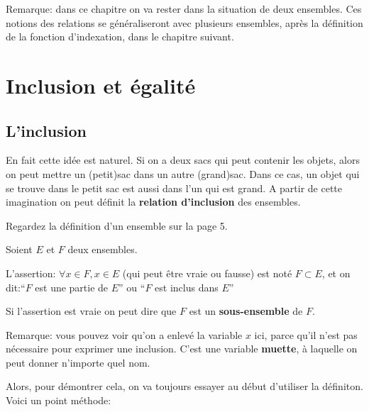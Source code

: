 \documentclass{article}
\begin{document}
Remarque: dans ce chapitre on va rester dans la situation de deux ensembles. Ces notions des relations se généraliseront avec plusieurs ensembles, après la définition de la fonction d'indexation, dans le chapitre suivant. 

\section{Inclusion et égalité}

\subsection{L'inclusion}

En fait cette idée est naturel. Si on a deux sacs qui peut contenir les objets, alors on peut mettre un (petit)sac dans un autre (grand)sac. Dans ce cas, un objet qui se trouve dans le petit sac est aussi dans l'un qui est grand. A partir de cette imagination on peut définit la \textbf{relation d'inclusion} des ensembles.

\begin{tcolorbox}[colback=red!5!white,colframe=red!75!black,title=Définition 2.0]

Regardez la définition d'un ensemble sur la page 5.

\end{tcolorbox}



\begin{tcolorbox}[colback=red!5!white,colframe=red!75!black,title=Définition 2.1]

Soient $E$ et $F$ deux ensembles. 

L'assertion: $\forall x \in F, x \in E$ (qui peut être vraie ou fausse) est noté $F \subset E$, et on dit:``$F$ est une partie de $E$'' ou ``$F$ est inclus dans $E$''

\tcblower

Si l'assertion est vraie on peut dire que $F$ est un \textbf{sous-ensemble} de $F$.


\end{tcolorbox}


Remarque: vous pouvez voir qu'on a enlevé la variable $x$ ici, parce qu'il n'est pas nécessaire pour exprimer une inclusion. C'est une variable \textbf{muette}, à laquelle on peut donner n'importe quel nom.

Alors, pour démontrer cela, on va toujours essayer au début d'utiliser la définiton. Voici un point méthode:
\end{document}
